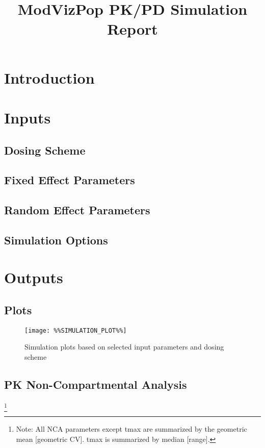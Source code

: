 \documentclass[10pt]{article}
\newcommand\blfootnote[1]{%
  \begingroup
  \renewcommand\thefootnote{}\footnote{#1}%
  \addtocounter{footnote}{-1}%
  \endgroup
}
\begin{document}
\thispagestyle{empty}
\title{ModVizPop PK/PD Simulation Report}
\maketitle
\tableofcontents

\section{Introduction}

\newpage
\begin{landscape}
\section{Inputs}
\subsection{Dosing Scheme}

\subsection{Fixed Effect Parameters}

\subsection{Random Effect Parameters}

\subsection{Simulation Options}


\newpage
\section{Outputs}
\subsection{Plots}
\begin{figure}[H]
\centering
\texttt{[image: \%\%SIMULATION\_PLOT\%\%]}
\caption{Simulation plots based on selected input parameters and dosing scheme}
\end{figure}

\newpage
\subsection{PK Non-Compartmental Analysis}
\blfootnote{Note: All NCA parameters except tmax are summarized by the geometric mean [geometric CV]. 
                                   tmax is summarized by median [range].}                                    
\end{landscape}
\end{document}
